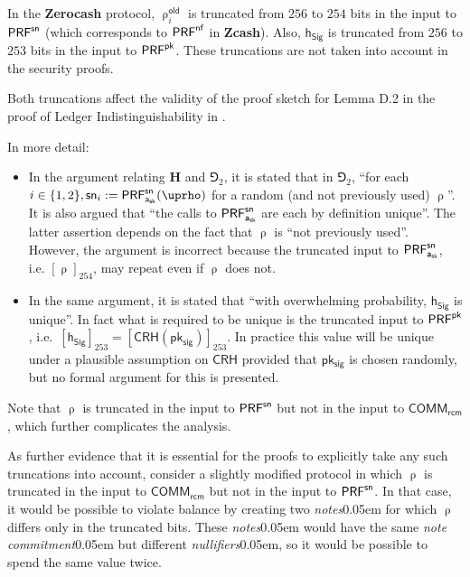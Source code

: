 \documentclass{article}
\let\oldcite\cite
\renewcommand{\cite}[2][]{\raisebox{0ex}{\oldcite[{#1}]{#2}}}
\newcommand{\introlist}{\needspace{15ex}}
\numberwithin{theorem}{subsection}
\newcommand{\sprout}[1]{}
\newcommand{\notsprout}[1]{#1}
\newcommand{\sprout}[1]{#1}
\newcommand{\notsprout}[1]{}
\newcommand{\term}[1]{\textsl{#1}\kern 0.05em\xspace}
\newcommand{\termbf}[1]{\textbf{#1}\xspace}
\newcommand{\Zcash}{\termbf{Zcash}}
\newcommand{\Zerocash}{\termbf{Zerocash}}
\newcommand{\notes}{\term{notes}}
\newcommand{\noteCommitment}{\term{note commitment}}
\newcommand{\nullifiers}{\term{nullifiers}}
\newcommand{\setof}[1]{\{{#1}\}}
\newcommand{\CRH}{\mathsf{CRH}}
\newcommand{\AuthPrivate}{\mathsf{a_{sk}}}
\newcommand{\PRF}[2]{\mathsf{{PRF}^{#2}_\mathnormal{#1}}}
\newcommand{\PRFnf}[1]{\PRF{#1}{\nf}}
\newcommand{\PRFsn}[1]{\PRF{#1}{sn}}
\newcommand{\PRFpk}[1]{\PRF{#1}{pk}}
\newcommand{\CommitAlg}{\mathsf{COMM}}
\newcommand{\Commit}[1]{\CommitAlg_{#1}}
\newcommand{\NoteCommitRand}{\mathsf{\sprout{r}\notsprout{rcm}}}
\newcommand{\NoteAddressRand}{\mathsf{\uprho}}
\newcommand{\NoteAddressRandOld}[1]{\NoteAddressRand^\mathsf{old}_{#1}}
\newcommand{\nf}{\mathsf{nf}}
\newcommand{\pksig}{\mathsf{pk_{sig}}}
\newcommand{\hSig}{\mathsf{h_{Sig}}}
\begin{document}
In the \Zerocash protocol, $\NoteAddressRandOld{i}$ is truncated from $256$
to $254$ bits in the input to $\PRFsn{}$ (which corresponds to $\PRFnf{}$ in \Zcash).
Also, $\hSig$ is truncated from $256$ to $253$ bits in the input to $\PRFpk{}$.
These truncations are not taken into account in the security proofs.

Both truncations affect the validity of the proof sketch for Lemma D.2 in
the proof of Ledger Indistinguishability in \cite[Appendix D]{BCGGMTV2014}.

\introlist
In more detail:

\begin{itemize}
  \item In the argument relating $\mathbf{H}$ and $\Game_2$, it is stated that in $\Game_2$,
        ``for each $i \in \setof{1, 2}, \mathsf{sn}_i := \PRFsn{\AuthPrivate}(\NoteAddressRand)$
        for a random (and not previously used) $\NoteAddressRand$''. It is also
        argued that ``the calls to $\PRFsn{\AuthPrivate}$ are each by definition unique''.
        The latter assertion depends on the fact that $\NoteAddressRand$
        is ``not previously used''. However, the argument is incorrect
        because the truncated input to $\PRFsn{\AuthPrivate}$, i.e.
        $[\NoteAddressRand]_{254}$, may repeat even if $\NoteAddressRand$ does not.
  \item In the same argument, it is stated that ``with overwhelming probability,
        $\hSig$ is unique''. In fact what is required to be unique is the
        truncated input to $\PRFpk{}$, i.e.\ $[\hSig]_{253} = [\CRH(\pksig)]_{253}$.
        In practice this value will be unique under a plausible assumption on
        $\CRH$ provided that $\pksig$ is chosen randomly, but no formal argument
        for this is presented.
\end{itemize}

Note that $\NoteAddressRand$ is truncated in the input to $\PRFsn{}$
but not in the input to $\Commit{\NoteCommitRand}$, which further
complicates the analysis.

As further evidence that it is essential for the proofs to explicitly take any
such truncations into account, consider a slightly modified protocol in which
$\NoteAddressRand$ is truncated in the input to $\Commit{\NoteCommitRand}$
but not in the input to $\PRFsn{}$. In that case, it would be possible to
violate balance by creating two \notes for which $\NoteAddressRand$ differs
only in the truncated bits. These \notes would have the same \noteCommitment
but different \nullifiers, so it would be possible to spend the same value
twice.
\end{document}
